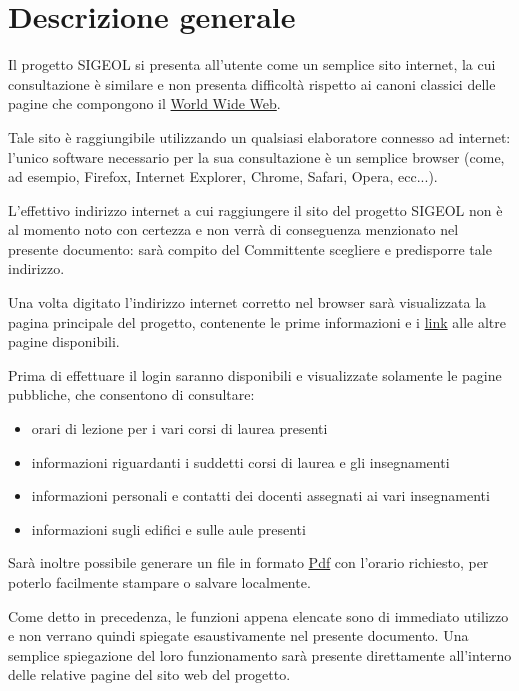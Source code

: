 \documentclass[11pt,a4paper]{article}
\begin{document}
\section{Descrizione generale}
Il progetto SIGEOL si presenta all'utente come un semplice sito internet, la cui consultazione è similare e non presenta difficoltà rispetto ai canoni classici delle pagine che compongono il \underline{World Wide Web}.

Tale sito è raggiungibile utilizzando un qualsiasi elaboratore connesso ad internet: l'unico software necessario per la sua consultazione è un semplice browser (come, ad esempio, Firefox, Internet Explorer, Chrome, Safari, Opera, ecc...).

L'effettivo indirizzo internet a cui raggiungere il sito del progetto SIGEOL non è al momento noto con certezza e non verrà di conseguenza menzionato nel presente documento: sarà compito del Committente scegliere e predisporre tale indirizzo.

Una volta digitato l'indirizzo internet corretto nel browser sarà visualizzata la pagina principale del progetto, contenente le prime informazioni e i \underline{link} alle altre pagine disponibili.

Prima di effettuare il login saranno disponibili e visualizzate solamente le pagine pubbliche, che consentono di consultare:
\begin{itemize}
 \item orari di lezione per i vari corsi di laurea presenti
 \item informazioni riguardanti i suddetti corsi di laurea e gli insegnamenti
 \item informazioni personali e contatti dei docenti assegnati ai vari insegnamenti
 \item informazioni sugli edifici e sulle aule presenti
\end{itemize}
Sarà inoltre possibile generare un file in formato \underline{Pdf} con l'orario richiesto, per poterlo facilmente stampare o salvare localmente.

Come detto in precedenza, le funzioni appena elencate sono di immediato utilizzo e non verrano quindi spiegate esaustivamente nel presente documento.
Una semplice spiegazione del loro funzionamento sarà presente direttamente all'interno delle relative pagine del sito web del progetto.
\end{document}

